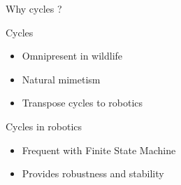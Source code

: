 \documentclass[10pt, xcolor={usenames, dvipsnames}]{beamer}
\begin{document}
        \begin{frame}{Why cycles ?}
            \hfill
            \begin{minipage}[c]{.6\textwidth}
                \begin{block}{Cycles}
                    \vspace{2.5mm}
                    \begin{itemize}
                        \item Omnipresent in wildlife
                        \item Natural mimetism
                        \item Transpose cycles to robotics
                    \end{itemize}
                \end{block}
                \begin{block}{Cycles in robotics}
                    \begin{itemize}
                        \item Frequent with Finite State Machine
                        \item Provides robustness and stability
                    \end{itemize}
                \end{block}
            \end{minipage}
            \hfill
            \begin{minipage}[c]{.35\textwidth}
                \begin{figure}

\end{figure}
\end{minipage}
\end{frame}
\end{document}
